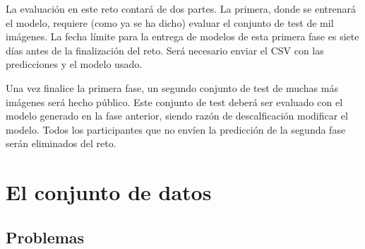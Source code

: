 La evaluación en este reto contará de dos partes. La primera, donde se entrenará el modelo, requiere (como ya se ha dicho) evaluar el conjunto de test de mil imágenes. La fecha límite para la entrega de modelos de esta primera fase es siete días antes de la finalización del reto. Será necesario enviar el CSV con las predicciones y el modelo usado.

Una vez finalice la primera fase, un segundo conjunto de test de muchas más imágenes será hecho público. Este conjunto de test deberá ser evaluado con el modelo generado en la fase anterior, siendo razón de descalficación modificar el modelo. Todos los participantes que no envíen la predicción de la segunda fase serán eliminados del reto.

\section{El conjunto de datos}

\subsection{Problemas}


